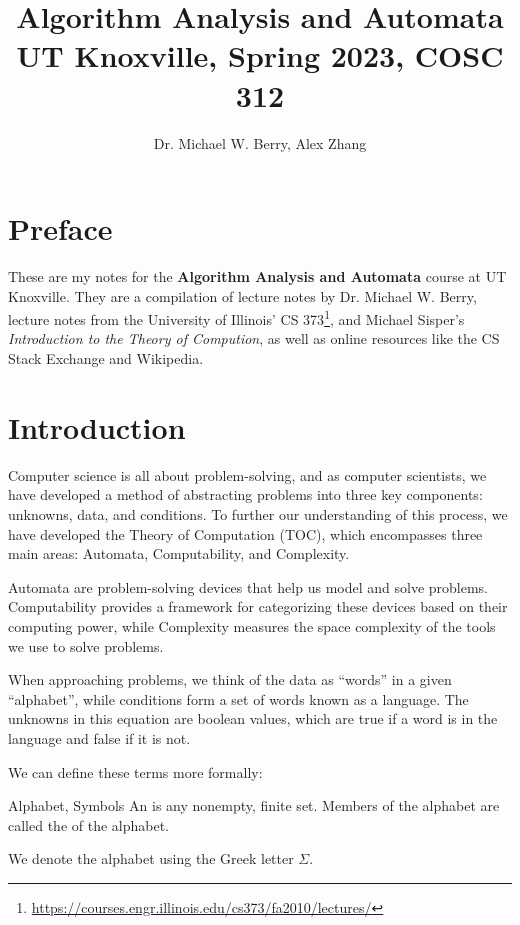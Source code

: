 \documentclass[math]{amznotes}
\title{\textbf{Algorithm Analysis and Automata}\\
\large UT Knoxville, Spring 2023, COSC 312}
\author{Dr. Michael W. Berry, Alex Zhang}
\begin{document}
\maketitle
\tableofcontents


\chapter*{Preface}
These are my notes for the \textbf{Algorithm Analysis and Automata} course at UT Knoxville. They are a compilation of lecture notes by Dr. Michael W. Berry, lecture notes from the University of Illinois' CS 373\footnote{\url{https://courses.engr.illinois.edu/cs373/fa2010/lectures/}}, and Michael Sisper's \textit{Introduction to the Theory of Compution}, as well as online resources like the CS Stack Exchange and Wikipedia.

\chapter{Introduction}
Computer science is all about problem-solving, and as computer scientists, we have developed a method of abstracting problems into three key components: unknowns, data, and conditions. To further our understanding of this process, we have developed the Theory of Computation (TOC), which encompasses three main areas: Automata, Computability, and Complexity.

Automata are problem-solving devices that help us model and solve problems. Computability provides a framework for categorizing these devices based on their computing power, while Complexity measures the space complexity of the tools we use to solve problems.

When approaching problems, we think of the data as ``words'' in a given ``alphabet'', while conditions form a set of words known as a language. The unknowns in this equation are boolean values, which are true if a word is in the language and false if it is not.

We can define these terms more formally:

\begin{dfnbox}{Alphabet, Symbols}{}
    An  is any nonempty, finite set. Members of the alphabet are called the  of the alphabet.
\end{dfnbox}

We denote the alphabet using the Greek letter $\Sigma$.
\end{document}
